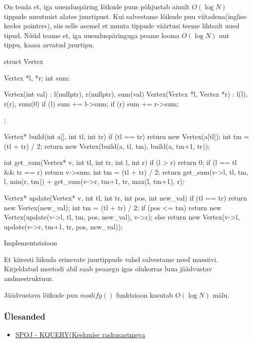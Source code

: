 \documentclass{trkut}
\theoremstyle{definition}
\begin{document}
On teada et, iga uuenduspäring lõikude puus põhjustab ainult $O(\log N)$ tippude muutmist alates juurtipust. 
Kui salvestame lõikude puu viitadena(inglise keeles pointers), siis selle asemel et muuta tippude väärtusi teeme lihtsalt uued tipud. Nüüd teame et, iga uuenduspäringuga peame looma $O(\log N)$ uut tippu, kaasa arvatud juurtipu.
\parencite{EMaxx}
\begin{cclol}
struct Vertex {
    Vertex *l, *r;
    int sum;

    Vertex(int val) : l(nullptr), r(nullptr), sum(val) {}
    Vertex(Vertex *l, Vertex *r) : l(l), r(r), sum(0) {
        if (l) sum += l->sum;
        if (r) sum += r->sum;
    }
};

Vertex* build(int a[], int tl, int tr) {
    if (tl == tr)
        return new Vertex(a[tl]);
    int tm = (tl + tr) / 2;
    return new Vertex(build(a, tl, tm), build(a, tm+1, tr));
}

int get_sum(Vertex* v, int tl, int tr, int l, int r) {
    if (l > r)
        return 0;
    if (l == tl && tr == r)
        return v->sum;
    int tm = (tl + tr) / 2;
    return get_sum(v->l, tl, tm, l, min(r, tm))
         + get_sum(v->r, tm+1, tr, max(l, tm+1), r);
}

Vertex* update(Vertex* v, int tl, int tr, int pos, int new_val) {
    if (tl == tr)
        return new Vertex(new_val);
    int tm = (tl + tr) / 2;
    if (pos <= tm)
        return new Vertex(update(v->l, tl, tm, pos, new_val), v->r);
    else
        return new Vertex(v->l, update(v->r, tm+1, tr, pos, new_val));
}
\end{cclol}
 \begin{kk}[H]%
    \caption{Implementatsioon}%
    \label{EMaxx}%
    \end{kk}
Et kiiresti liikuda erinevate juurtippude vahel salvestame need massiivi.
Kirjeldatud meetodi abil saab peaaegu igas olukorras luua jäädvustav andmestruktuur. 

Jäädvustava lõikude puu $modify()$ funktsioon kasutab $O(\log N)$ mälu.

\subsubsection{Ülesanded}
\begin{itemize}
    \item \href{https://www.spoj.com/problems/KQUERY/}{SPOJ - KQUERY(Keskmise raskusastmega}
\end{itemize}
\end{document}
